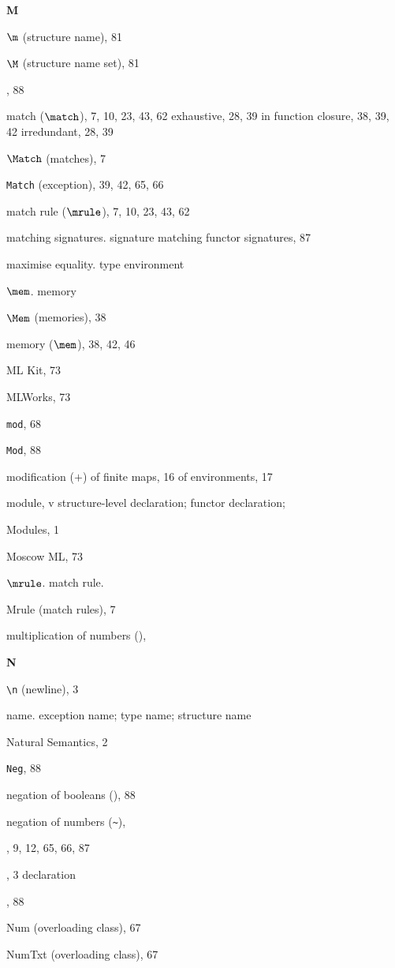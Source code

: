 \begin{theindex}
\parbox{64mm}{\hfil{\large\bf M}\hfil}

\indexspace

\item $\m$ (structure name), 81
\item $\M$ (structure name set), 81
\item {}, 88
\item match ($\match$), 7, 10, 23, 43, 62
\subitem exhaustive, 28, 39
\subitem in function closure, 38, 39, 42
\subitem irredundant, 28, 39
\item $\Match$ (matches), 7
\item {\tt Match} (exception), 39, 42, 65, 66
\item match rule ($\mrule$), 7, 10, 23, 43, 62
\item matching 
\subitem signatures. \see signature matching 
\subitem functor signatures, 87
\item maximise equality. \see type environment
\item $\mem$. \see memory
\item $\Mem$ (memories), 38
\item memory ($\mem$), 38, 42, 46
\item ML Kit, 73
\item MLWorks, 73
\item {\tt mod}, 68
\item {\tt Mod}, 88
\item modification ($+$) 
\subitem of finite maps, 16
\subitem of environments, 17
\item module, v
\subitem \seealso structure-level declaration; functor declaration; 
\item Modules, 1
\item Moscow ML, 73
\item $\mrule$.  \see match rule.
\item Mrule (match rules), 7
\item multiplication of numbers (\ml{*}), \mulrefs
\indexspace

\parbox{64mm}{\hfil{\large\bf N}\hfil}

\indexspace
\item \verb+\n+ (newline), 3
\item name. \see exception name; type name; structure name
\item Natural Semantics, 2
\item {\tt Neg}, 88
\item negation of booleans (), 88
\item negation of numbers (\verb+~+), \unaryminusrefs
\item \NIL, 9, 12, 65, 66, 87
\item \NONFIX, 3
\subitem \seealso declaration
\item {}, 88
\item Num (overloading class), 67
\item NumTxt (overloading class), 67
\indexspace


\end{theindex}
